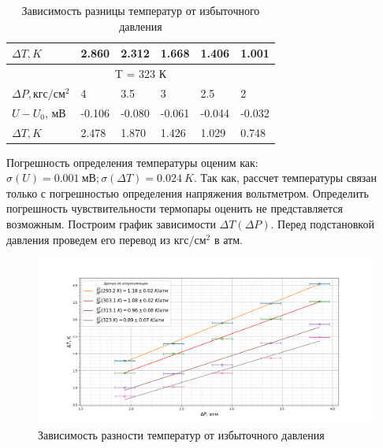 \documentclass[a4paper, 12pt]{article}%
\begin{document}
\begin{table}[H]
\begin{tabular}{|lccccc|}
			\multicolumn{1}{|l|}{$\Delta T, K$} & \multicolumn{1}{c|}{2.860}  & \multicolumn{1}{c|}{2.312}  & \multicolumn{1}{c|}{1.668}  & \multicolumn{1}{c|}{1.406}  & 1.001                       \\ \hline
			\multicolumn{6}{|c|}{T = 323 К}                                                                                                                                                     \\ \hline
			\multicolumn{1}{|l|}{$\Delta P, кгс/см^2$}       & \multicolumn{1}{l|}{4}      & \multicolumn{1}{l|}{3.5}    & \multicolumn{1}{l|}{3}      & \multicolumn{1}{l|}{2.5}    & \multicolumn{1}{l|}{2}      \\ \hline
			\multicolumn{1}{|l|}{$U-U_0$, мВ}       & \multicolumn{1}{l|}{-0.106} & \multicolumn{1}{l|}{-0.080} & \multicolumn{1}{l|}{-0.061} & \multicolumn{1}{l|}{-0.044} & \multicolumn{1}{l|}{-0.032} \\ \hline
			\multicolumn{1}{|l|}{$\Delta T, K$} & \multicolumn{1}{l|}{2.478}  & \multicolumn{1}{l|}{1.870}  & \multicolumn{1}{l|}{1.426}  & \multicolumn{1}{l|}{1.029}  & \multicolumn{1}{l|}{0.748}  \\ \hline
		\end{tabular}
		\caption{Зависимость разницы температур от избыточного давления}
	\end{table}
	Погрешность определения температуры оценим как: $\sigma (U) = 0.001~мВ; \sigma (\Delta T) = 0.024~K$. Так как, рассчет температуры связан только с погрешностью определения напряжения вольтметром. Определить погрешность чувствительности термопары оценить не представляется возможным.
	Построим график зависимости $\Delta T (\Delta P)$. Перед подстановкой давления проведем его перевод из $кгс/см^2$ в атм.\\
	\begin{figure}[H]
		\centering
		\includegraphics[width=0.95\linewidth]{graph_dj}
		\caption[]{Зависимость разности температур от избыточного давления}
		\label{fig:graphdj}
	\end{figure}
\end{document}
